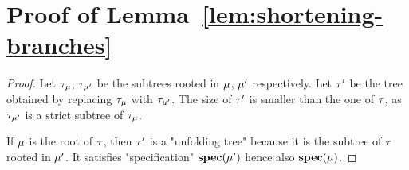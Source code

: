 \section{Proof of Lemma~\ref{lem:shortening-branches}}
\label{app:proofs-reduction-branches}

\lemShorteningBranches*

\begin{proof}
	Let $\tau_{\mu}$, $\tau_{\mu'}$ be the subtrees rooted in $\mu$, $\mu'$ respectively. 
	Let $\tau'$ be the tree obtained by replacing $\tau_{\mu}$ with $\tau_{\mu'}$. The size of $\tau'$ is smaller than the one of $\tau$, as $\tau_{\mu'}$ is a strict subtree of $\tau_{\mu}$.
	
	If $\mu$ is the root of $\tau$, then $\tau'$ is a "unfolding tree" because it is the subtree of $\tau$ rooted in $\mu'$. It satisfies "specification" $\mathbf{spec}(\mu')$ hence also $\mathbf{spec}(\mu)$. 
	



	

\end{proof}
